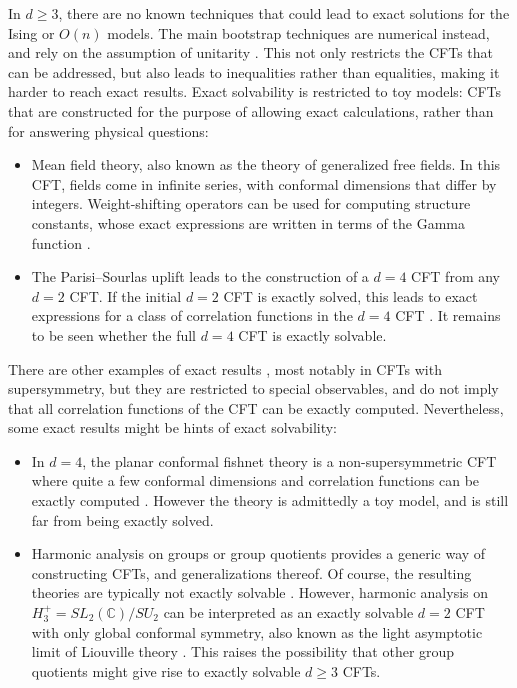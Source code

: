 \documentclass[12pt, a4paper]{article}
\begin{document}
In $d\geq 3$, there are no known techniques that could lead to exact solutions for the Ising or $O(n)$ models. The main bootstrap techniques are numerical instead, and rely on the assumption of unitarity \cite{prv18}. This not only restricts the CFTs that can be addressed, but also leads to inequalities rather than equalities, making it harder to reach exact results. 
Exact solvability is restricted to toy models: CFTs that are constructed for the purpose of allowing exact calculations, rather than for answering physical questions: 
\begin{itemize}
 \item Mean field theory, also known as the theory of generalized free fields. In this CFT, fields come in infinite series, with conformal dimensions that differ by integers. Weight-shifting operators can be used for computing structure constants, whose exact expressions are written in terms of the Gamma function \cite{kks18}.
 \item The Parisi--Sourlas uplift leads to the construction of a $d=4$ CFT from any $d=2$ CFT. If the initial $d=2$ CFT is exactly solved, this leads to exact expressions for a class of correlation functions in the $d=4$ CFT \cite{tre24}. It remains to be seen whether the full $d=4$ CFT is exactly solvable.
\end{itemize}
There are other examples of exact results \cite{vtrz+25}, most notably in CFTs with supersymmetry, but they are restricted to special observables, and do not imply that all correlation functions of the CFT can be exactly computed. Nevertheless, some exact results might be hints of exact solvability:
\begin{itemize}
 \item In $d=4$, the planar conformal fishnet theory is a non-supersymmetric CFT where quite a few conformal dimensions and correlation functions can be exactly computed \cite{gkk18}. However the theory is admittedly a toy model, and is still far from being exactly solved.
 \item Harmonic analysis on groups or group quotients provides a generic way of constructing CFTs, and generalizations thereof. Of course, the resulting theories are typically not exactly solvable \cite{kmp21}. However, harmonic analysis on $H_3^+=SL_2(\mathbb{C})/SU_2$ can be interpreted as an exactly solvable $d=2$ CFT with only global conformal symmetry, also known as the light asymptotic limit of Liouville theory \cite{rib14}. This raises the possibility that other group quotients might give rise to exactly solvable $d\geq 3$ CFTs. 
\end{itemize}
\end{document}

